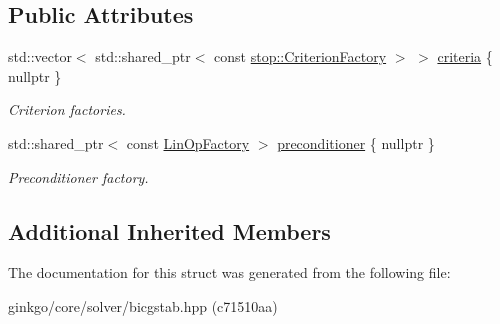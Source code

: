 \subsection*{Public Attributes}
\begin{DoxyCompactItemize}
\item 
\mbox{\label{structgko_1_1solver_1_1Bicgstab_1_1parameters__type_a98e25950c6dcaa68eacc241fbc8bd521}} 
std\+::vector$<$ std\+::shared\+\_\+ptr$<$ const \hyperlink{group__stop_gab12a51109c50b35ec36dc5a393d6a9a0}{stop\+::\+Criterion\+Factory} $>$ $>$ \hyperlink{structgko_1_1solver_1_1Bicgstab_1_1parameters__type_a98e25950c6dcaa68eacc241fbc8bd521}{criteria} \{ nullptr \}
\begin{DoxyCompactList}\small\item\em Criterion factories. \end{DoxyCompactList}\item 
\mbox{\label{structgko_1_1solver_1_1Bicgstab_1_1parameters__type_a758bdb82889e200ff6800e34e9a2d5c4}} 
std\+::shared\+\_\+ptr$<$ const \hyperlink{classgko_1_1LinOpFactory}{Lin\+Op\+Factory} $>$ \hyperlink{structgko_1_1solver_1_1Bicgstab_1_1parameters__type_a758bdb82889e200ff6800e34e9a2d5c4}{preconditioner} \{ nullptr \}
\begin{DoxyCompactList}\small\item\em Preconditioner factory. \end{DoxyCompactList}\end{DoxyCompactItemize}
\subsection*{Additional Inherited Members}


The documentation for this struct was generated from the following file\+:\begin{DoxyCompactItemize}
\item 
ginkgo/core/solver/bicgstab.\+hpp (c71510aa)\end{DoxyCompactItemize}
